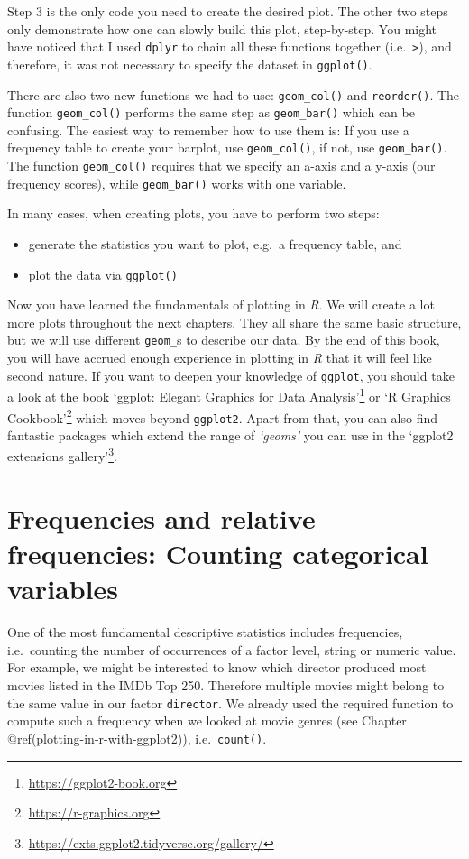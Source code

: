 \documentclass[
  letterpaper,
]{krantz}
\renewcommand{\href}[2]{#2\footnote{\url{#1}}}
\begin{document}
Step 3 is the only code you need to create the desired plot. The other
two steps only demonstrate how one can slowly build this plot,
step-by-step. You might have noticed that I used \texttt{dplyr} to chain
all these functions together (i.e.~\texttt{\textbar{}\textgreater{}}),
and therefore, it was not necessary to specify the dataset in
\texttt{ggplot()}.

There are also two new functions we had to use: \texttt{geom\_col()} and
\texttt{reorder()}. The function \texttt{geom\_col()} performs the same
step as \texttt{geom\_bar()} which can be confusing. The easiest way to
remember how to use them is: If you use a frequency table to create your
barplot, use \texttt{geom\_col()}, if not, use \texttt{geom\_bar()}. The
function \texttt{geom\_col()} requires that we specify an a-axis and a
y-axis (our frequency scores), while \texttt{geom\_bar()} works with one
variable.

In many cases, when creating plots, you have to perform two steps:

\begin{itemize}
\item
  generate the statistics you want to plot, e.g.~a frequency table, and
\item
  plot the data via \texttt{ggplot()}
\end{itemize}

Now you have learned the fundamentals of plotting in \emph{R}. We will
create a lot more plots throughout the next chapters. They all share the
same basic structure, but we will use different \texttt{geom\_}s to
describe our data. By the end of this book, you will have accrued enough
experience in plotting in \emph{R} that it will feel like second nature.
If you want to deepen your knowledge of \texttt{ggplot}, you should take
a look at the book \href{https://ggplot2-book.org}{`ggplot: Elegant
Graphics for Data Analysis'} or \href{https://r-graphics.org}{`R
Graphics Cookbook'} which moves beyond \texttt{ggplot2}. Apart from
that, you can also find fantastic packages which extend the range of
\emph{`geoms'} you can use in the
\href{https://exts.ggplot2.tidyverse.org/gallery/}{`ggplot2 extensions
gallery'}.

\section{Frequencies and relative frequencies: Counting categorical
variables}\label{sec-frequency}

One of the most fundamental descriptive statistics includes frequencies,
i.e.~counting the number of occurrences of a factor level, string or
numeric value. For example, we might be interested to know which
director produced most movies listed in the IMDb Top 250. Therefore
multiple movies might belong to the same value in our factor
\texttt{director}. We already used the required function to compute such
a frequency when we looked at movie genres (see Chapter
@ref(plotting-in-r-with-ggplot2)), i.e.~\texttt{count()}.
\end{document}
